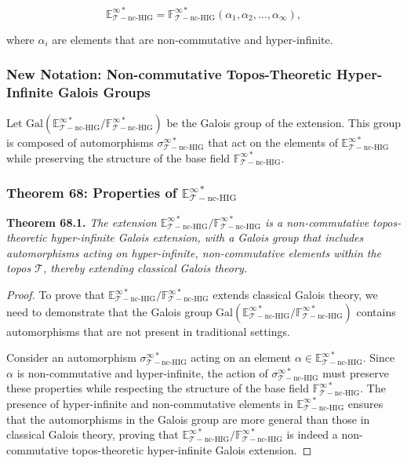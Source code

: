 \documentclass{article}
\begin{document}
\[
\mathbb{E}_{\mathcal{T}-\text{nc-HIG}}^{\infty *} = \mathbb{F}_{\mathcal{T}-\text{nc-HIG}}^{\infty *}(\alpha_1, \alpha_2, \dots, \alpha_{\infty}),
\]

where \(\alpha_i\) are elements that are non-commutative and hyper-infinite.

\subsubsection{New Notation: Non-commutative Topos-Theoretic Hyper-Infinite Galois Groups}
Let \(\text{Gal}(\mathbb{E}_{\mathcal{T}-\text{nc-HIG}}^{\infty *}/\mathbb{F}_{\mathcal{T}-\text{nc-HIG}}^{\infty *})\) be the Galois group of the extension. This group is composed of automorphisms \(\sigma_{\mathcal{T}-\text{nc-HIG}}^{\infty *}\) that act on the elements of \(\mathbb{E}_{\mathcal{T}-\text{nc-HIG}}^{\infty *}\) while preserving the structure of the base field \(\mathbb{F}_{\mathcal{T}-\text{nc-HIG}}^{\infty *}\).

\subsubsection{Theorem 68: Properties of \(\mathbb{E}_{\mathcal{T}-\text{nc-HIG}}^{\infty *}\)}
\textbf{Theorem 68.1.} \textit{The extension \(\mathbb{E}_{\mathcal{T}-\text{nc-HIG}}^{\infty *}/\mathbb{F}_{\mathcal{T}-\text{nc-HIG}}^{\infty *}\) is a non-commutative topos-theoretic hyper-infinite Galois extension, with a Galois group that includes automorphisms acting on hyper-infinite, non-commutative elements within the topos \(\mathcal{T}\), thereby extending classical Galois theory.}

\begin{proof}
To prove that \(\mathbb{E}_{\mathcal{T}-\text{nc-HIG}}^{\infty *}/\mathbb{F}_{\mathcal{T}-\text{nc-HIG}}^{\infty *}\) extends classical Galois theory, we need to demonstrate that the Galois group \(\text{Gal}(\mathbb{E}_{\mathcal{T}-\text{nc-HIG}}^{\infty *}/\mathbb{F}_{\mathcal{T}-\text{nc-HIG}}^{\infty *})\) contains automorphisms that are not present in traditional settings.

Consider an automorphism \(\sigma_{\mathcal{T}-\text{nc-HIG}}^{\infty *}\) acting on an element \(\alpha \in \mathbb{E}_{\mathcal{T}-\text{nc-HIG}}^{\infty *}\). Since \(\alpha\) is non-commutative and hyper-infinite, the action of \(\sigma_{\mathcal{T}-\text{nc-HIG}}^{\infty *}\) must preserve these properties while respecting the structure of the base field \(\mathbb{F}_{\mathcal{T}-\text{nc-HIG}}^{\infty *}\). The presence of hyper-infinite and non-commutative elements in \(\mathbb{E}_{\mathcal{T}-\text{nc-HIG}}^{\infty *}\) ensures that the automorphisms in the Galois group are more general than those in classical Galois theory, proving that \(\mathbb{E}_{\mathcal{T}-\text{nc-HIG}}^{\infty *}/\mathbb{F}_{\mathcal{T}-\text{nc-HIG}}^{\infty *}\) is indeed a non-commutative topos-theoretic hyper-infinite Galois extension.
\end{proof}
\end{document}
